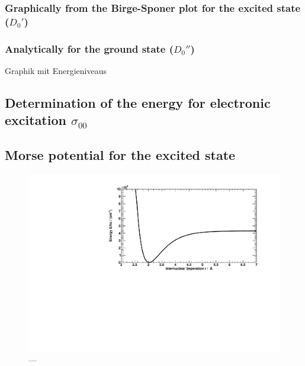 \subsubsection{Graphically from the Birge-Sponer plot for the excited state ($D_0'$)}

\subsubsection{Analytically for the ground state ($D_0''$)}

Graphik mit Energieniveaus

\subsection{Determination of the energy for electronic excitation \texorpdfstring{$\sigma_{00}$}{s00}}

\subsection{Morse potential for the excited state}


\begin{figure}[H]
\begin{center}
  \includegraphics[width=\textwidth]{../img/morse.pdf}
  \caption[---]{---}
  \label{img:morse}
\end{center}
\end{figure}

